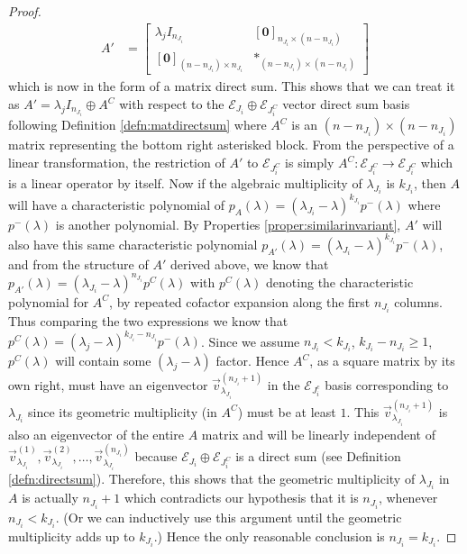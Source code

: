 \begin{proof}
\begin{align*}
A' &=  
\begin{bmatrix}
\lambda_j I_{n_{J_i}} & [\textbf{0}]_{n_{J_i}\times(n-n_{J_i})} \\
[\textbf{0}]_{(n-n_{J_i})\times n_{J_i}} & *_{(n-n_{J_i})\times(n-n_{J_i})}
\end{bmatrix}
\end{align*}
which is now in the form of a matrix direct sum. This shows that we can treat it as $A' = \lambda_j I_{n_{J_i}} \oplus A^C$ with respect to the $\mathcal{E}_{J_i} \oplus \mathcal{E}_{J_i^C}$ vector direct sum basis following Definition \ref{defn:matdirectsum} where $A^C$ is an $(n-n_{J_i})\times(n-n_{J_i})$ matrix representing the bottom right asterisked block. From the perspective of a linear transformation, the restriction of $A'$ to $\mathcal{E}_{J_i^C}$ is simply $A^C: \mathcal{E}_{J_i^C} \to \mathcal{E}_{J_i^C}$ which is a linear operator by itself. Now if the algebraic multiplicity of $\lambda_{J_i}$ is $k_{J_i}$, then $A$ will have a characteristic polynomial of $p_A(\lambda) = (\lambda_{J_i}-\lambda)^{k_{J_i}} p^-(\lambda)$ where $p^-(\lambda)$ is another polynomial. By Properties \ref{proper:similarinvariant}, $A'$ will also have this same characteristic polynomial $p_{A'}(\lambda) = (\lambda_{J_i}-\lambda)^{k_{J_i}} p^-(\lambda)$, and from the structure of $A'$ derived above, we know that $p_{A'}(\lambda) = (\lambda_{J_i}-\lambda)^{n_{J_i}} p^C(\lambda)$ with $p^C(\lambda)$ denoting the characteristic polynomial for $A^C$, by repeated cofactor expansion along the first $n_{J_i}$ columns. Thus comparing the two expressions we know that $p^C(\lambda) = (\lambda_j-\lambda)^{k_{J_i} - n_{J_i}}p^-(\lambda)$. Since we assume $n_{J_i} < k_{J_i}$, $k_{J_i} - n_{J_i} \geq 1$, $p^C(\lambda)$ will contain some $(\lambda_j-\lambda)$ factor. Hence $A^C$, as a square matrix by its own right, must have an eigenvector $\vec{v}^{(n_{J_i}+1)}_{\lambda_{J_i}}$ in the $\mathcal{E}_{J_i^c}$ basis corresponding to $\lambda_{J_i}$ since its geometric multiplicity (in $A^C$) must be at least $1$. This $\vec{v}^{(n_{J_i}+1)}_{\lambda_{J_i}}$ is also an eigenvector of the entire $A$ matrix and will be linearly independent of $\vec{v}^{(1)}_{\lambda_{J_i}}, \vec{v}^{(2)}_{\lambda_{J_i}}, \ldots, \vec{v}^{(n_{J_i})}_{\lambda_{J_i}}$ because $\mathcal{E}_{J_i} \oplus \mathcal{E}_{J_i^C}$ is a direct sum (see Definition \ref{defn:directsum}). Therefore, this shows that the geometric multiplicity of $\lambda_{J_i}$ in $A$ is actually $n_{J_i}+1$ which contradicts our hypothesis that it is $n_{J_i}$, whenever $n_{J_i} < k_{J_i}$. (Or we can inductively use this argument until the geometric multiplicity adds up to $k_{J_i}$.) Hence the only reasonable conclusion is $n_{J_i} = k_{J_i}$. 
\end{proof}

